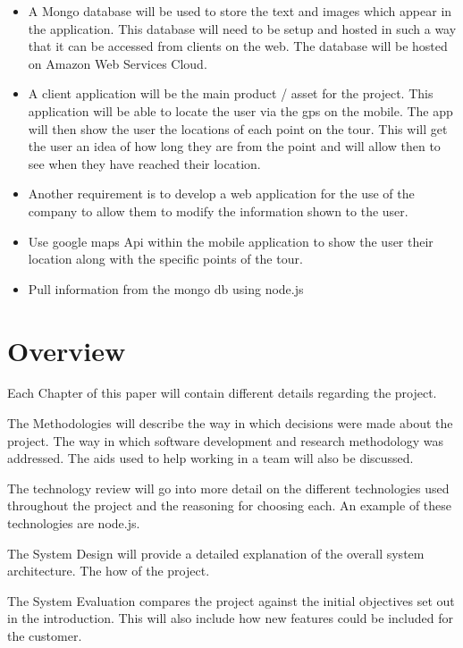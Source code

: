 \begin{itemize}
\item A Mongo database will be used to store the text and images which appear in the application. This database will need to be setup and hosted in such a way that it can be accessed from clients on the web. The database will be hosted on Amazon Web Services Cloud.

\item A client application will be the main product / asset for the project. This application will be able to locate the user via the gps on the mobile. The app will then show the user the locations of each point on the tour. This will get the user an idea of how long they are from the point and will allow then to see when they have reached their location.

\item Another requirement is to develop a web application for the use of the company to allow them to modify the information shown to the user.

\item Use google maps Api within the mobile application to show the user their location along with the specific points of the tour.

\item Pull information from the mongo db using node.js


\end{itemize}
\section{Overview}

Each Chapter of this paper will contain different details regarding the project. 

The Methodologies will describe the way in which decisions were made about the project. The way in which software development and research methodology was addressed. The aids used to help working in a team will also be discussed.

The technology review will go into more detail on the different technologies used throughout the project and the reasoning for choosing each. An example of these technologies are node.js.

The System Design will provide a detailed explanation of the overall system architecture. The how of the project.

The System Evaluation compares the project against the initial objectives set out in the introduction. This will also include how new features could be included for the customer.

